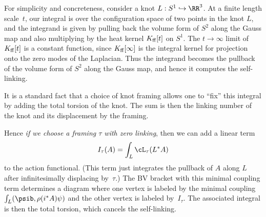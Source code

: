 \documentclass[10pt]{amsart}
\begin{document}
For simplicity and concreteness, consider a knot $L: S^1 \hookrightarrow \RR^3$.
At a finite length scale~$t$, our integral is over the configuration space of two points in the knot $L$,
and the integrand is given by pulling back the volume form of $S^2$ along the Gauss map and also multiplying by the heat kernel $K_{\rm ff}[t]$ on $S^1$.
The $t \to \infty$ limit of $K_{\rm ff}[t]$ is a constant function, 
since $K_{\rm ff}[\infty]$ is the integral kernel for projection onto the zero modes of the Laplacian.
Thus the integrand becomes the pullback of the volume form of $S^2$ along the Gauss map,
and hence it computes the self-linking.

It is a standard fact that a choice of knot framing allows one to ``fix'' this integral by adding the total torsion of the knot.
The sum is then the linking number of the knot and its displacement by the framing.

Hence {\em if we choose a framing $\tau$ with zero linking}, 
then we can add a linear term 
\[
I_\tau(A) = \int_L \cL_\tau(L^* A)
\]
to the action functional.
(This term just integrates the pullback of $A$ along $L$ after infinitesimally displacing by~$\tau$.)
The BV bracket with this minimal coupling term determines a diagram
where one vertex is labeled by the minimal coupling $\int_L ( \psib, \rho(i^*A) \psi )$ and the other vertex is labeled by~$I_\tau$.
The associated integral is then the total torsion, which cancels the self-linking.






\end{document}
